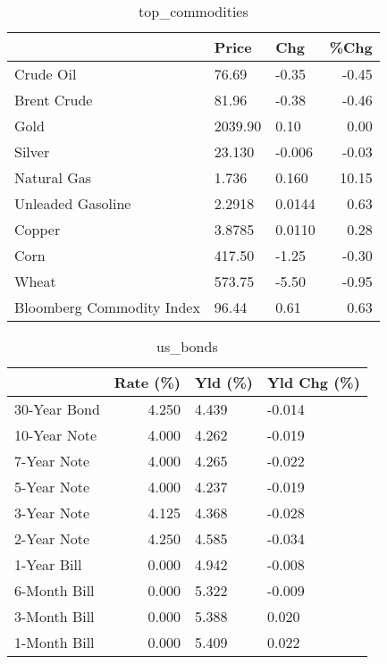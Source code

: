 \documentclass{article}%
\begin{document}
\begin{table}[htbp]%
\caption{top\_commodities}%
\centering%
\begin{adjustbox}{width=1\textwidth}%
\begin{tabular}{lllr}
\toprule
                          &   Price &    Chg &  \%Chg \\
\midrule
               Crude Oil  &   76.69 &  -0.35 & -0.45 \\
             Brent Crude  &   81.96 &  -0.38 & -0.46 \\
                    Gold  & 2039.90 &   0.10 &  0.00 \\
                  Silver  &  23.130 & -0.006 & -0.03 \\
             Natural Gas  &   1.736 &  0.160 & 10.15 \\
       Unleaded Gasoline  &  2.2918 & 0.0144 &  0.63 \\
                  Copper  &  3.8785 & 0.0110 &  0.28 \\
                    Corn  &  417.50 &  -1.25 & -0.30 \\
                   Wheat  &  573.75 &  -5.50 & -0.95 \\
Bloomberg Commodity Index &   96.44 &   0.61 &  0.63 \\
\bottomrule
\end{tabular}
%
\end{adjustbox}%
\end{table}

%


\begin{table}[htbp]%
\caption{us\_bonds}%
\centering%
\begin{adjustbox}{width=1\textwidth}%
\begin{tabular}{lrll}
\toprule
             &  Rate (\%) & Yld (\%) & Yld Chg (\%) \\
\midrule
30-Year Bond &     4.250 &   4.439 &      -0.014 \\
10-Year Note &     4.000 &   4.262 &      -0.019 \\
 7-Year Note &     4.000 &   4.265 &      -0.022 \\
 5-Year Note &     4.000 &   4.237 &      -0.019 \\
 3-Year Note &     4.125 &   4.368 &      -0.028 \\
 2-Year Note &     4.250 &   4.585 &      -0.034 \\
 1-Year Bill &     0.000 &   4.942 &      -0.008 \\
6-Month Bill &     0.000 &   5.322 &      -0.009 \\
3-Month Bill &     0.000 &   5.388 &       0.020 \\
1-Month Bill &     0.000 &   5.409 &       0.022 \\
\bottomrule
\end{tabular}
%
\end{adjustbox}%
\end{table}
\end{document}
